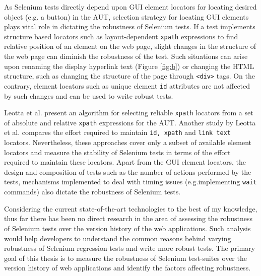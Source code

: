 As Selenium tests directly depend upon GUI element locators for locating desired object (e.g. a button) in the AUT, selection strategy for locating GUI elements plays vital role in dictating the robustness of Selenium tests. If a test implements structure based locators such as layout-dependent \texttt{xpath} expressions to find relative position of an element on the web page, slight changes in the structure of the web page can diminish the robustness of the test. Such situations can arise upon renaming the display hyperlink text (Figure \ref{fig:b}) or changing the HTML structure, such as changing the structure of the page through \texttt{<div>} tags. On the contrary, element locators such as unique element \texttt{id} attributes are not affected by such changes and can be used to write robust tests. 

Leotta et al. \cite{leotta2015using} present an algorithm for selecting reliable \texttt{xpath} locators from a set of absolute and relative \texttt{xpath} expressions for the AUT. Another study by Leotta et al. \cite{leotta2013comparing} compares the effort required to maintain \texttt{id, xpath} and \texttt{link text} locators. Nevertheless, these approaches cover only a subset of available element locators and measure the stability of Selenium tests in terms of the effort required to maintain these locators. Apart from the GUI element locators, the design and composition of tests such as the number of actions performed by the tests, mechanisms implemented to deal with timing issues (e.g.\smallskip implementing \texttt{wait} commands) also dictate the robustness of Selenium tests. 



Considering the current state-of-the-art technologies to the best of my knowledge, thus far there has been no direct research in the area of assessing the robustness of Selenium tests over the version history of the web applications. Such analysis would help developers to understand the common reasons behind varying robustness of Selenium regression tests and write more robust tests. The primary goal of this thesis is to measure the robustness of Selenium test-suites over the version history of web applications and identify the factors affecting robustness. 

